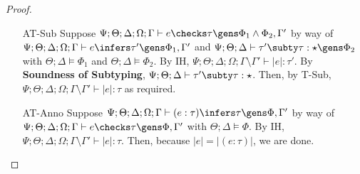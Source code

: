 \begin{proof}
\begin{enumerate}
 
  \item[AT-Sub] Suppose $\Psi ; \Theta ; \Delta ; \Omega ; \Gamma \vdash e \checks \tau \gens \Phi_1 \wedge \Phi_2,\Gamma'$ by way of $\Psi ; \Theta ; \Delta ; \Omega ; \Gamma \vdash e \infers \tau' \gens \Phi_1,\Gamma'$ and $\Psi;\Theta;\Delta \vdash \tau' \subty \tau : \star \gens \Phi_2$ with $\Theta ; \Delta \vDash \Phi_1$ and $\Theta ; \Delta \vDash \Phi_2$. By IH,  $\Psi ; \Theta ; \Delta ; \Omega ; \Gamma \setminus \Gamma' \vdash |e| : \tau'$. By \textbf{Soundness of Subtyping}, $\Psi;\Theta;\Delta \vdash \tau' \subty \tau : \star$. Then, by T-Sub, $\Psi ; \Theta ; \Delta ; \Omega ; \Gamma\setminus \Gamma' \vdash |e| : \tau$ as required.
  
  
  \item[AT-Anno] Suppose $\Psi ; \Theta ; \Delta ; \Omega ; \Gamma \vdash (e : \tau) \infers \tau \gens \Phi,\Gamma'$ by way of $\Psi ; \Theta ; \Delta ; \Omega ; \Gamma \vdash e \checks \tau \gens \Phi,\Gamma'$ with $\Theta ; \Delta \vDash \Phi$. By IH, $\Psi ; \Theta ; \Delta ; \Omega ; \Gamma \setminus \Gamma' \vdash |e| : \tau$. Then, because $|e| = |(e : \tau)|$, we are done.
   
\end{enumerate}
\end{proof}
